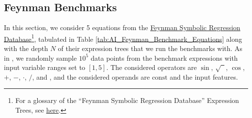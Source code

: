 \documentclass[runningheads]{llncs}
\newcommand\specialcaret{%
  \stackengine{0pt}{\ \,}{\scalebox{1.1}[2]{\raisebox{-0.9ex}{\string^}}}{O}{c}{F}{T}{L}}
\begin{document}
\subsection{Feynman Benchmarks} \label{subsec:FeynmanBenchmarks}
In this section, we consider 5 equations from the \href{https://space.mit.edu/home/tegmark/aifeynman.html}{Feynman Symbolic Regression Database}\footnote{For a glossary of the ``Feynman Symbolic Regression Database'' Expression Trees, see \href{https://edfink234.github.io/AIFeynmanExpressionTrees/AIFeynmanExpressionTrees/AIFeynmanExpressionTrees}{here}.}, tabulated in Table \ref{tab:AI_Feynman_Benchmark_Equations} along with the depth $N$ of their expression trees that we run the benchmarks with. As in \cite{udrescu2020ai}, we randomly sample $10^5$ data points from the benchmark expressions with input variable ranges set to $[1, 5]$. The considered operators are $\sin$, $\sqrt{\phantom{1}}$, $\cos$, $+$, $-$, $\cdot$, $/$, and \specialcaret, and the considered operands are $\mathrm{const}$ and the input features. 
\end{document}
